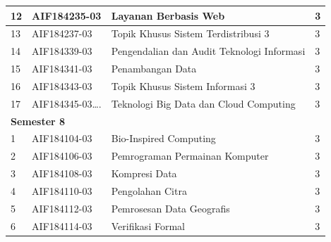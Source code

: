 \begin{table}[H]
\begin{tabular}{|p{0.5cm}|p{2.85cm}|p{4.95cm}|p{2.7cm}|}
			12  & AIF184235-03    & Layanan Berbasis Web                       & 3   \\ \hline
13  & AIF184237-03    & Topik Khusus Sistem Terdistribusi 3        & 3   \\ \hline
14  & AIF184339-03    & Pengendalian dan Audit Teknologi Informasi & 3   \\ \hline
15  & AIF184341-03    & Penambangan Data                           & 3   \\ \hline
16  & AIF184343-03    & Topik Khusus Sistem Informasi 3            & 3   \\ \hline
17  & AIF184345-03….  & Teknologi Big Data dan Cloud Computing     & 3   \\ \hline
\multicolumn{4}{|l|}{\textbf{Semester 8}}                                \\ \hline
1   & AIF184104-03    & Bio-Inspired Computing                     & 3   \\ \hline
2   & AIF184106-03    & Pemrograman Permainan Komputer             & 3   \\ \hline
3   & AIF184108-03    & Kompresi Data                              & 3   \\ \hline
4   & AIF184110-03    & Pengolahan Citra                           & 3   \\ \hline
5   & AIF184112-03    & Pemrosesan Data Geografis                  & 3   \\ \hline
6   & AIF184114-03    & Verifikasi Formal                          & 3   \\ \hline
		\end{tabular}
	\label{tab:kuliahpilihan_2}
\end{table}

